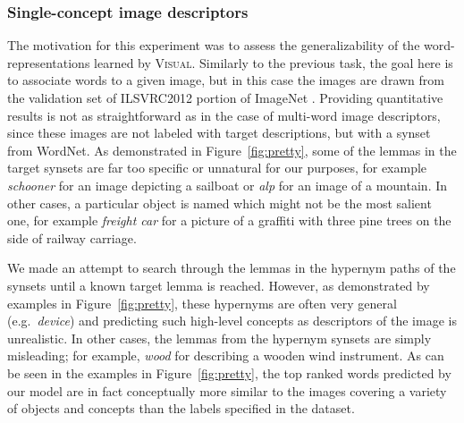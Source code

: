 \subsubsection{Single-concept image descriptors}
The motivation for this experiment was to assess
the generalizability of the word-representations learned by \textsc{Visual}.
Similarly to the previous task, the goal here is to associate words to a
given image, but in this case the images are drawn from the
validation set of ILSVRC2012 portion of ImageNet
\citep{russakovsky2015imagenet}. Providing quantitative results is not as
straightforward as in the case of multi-word image descriptors, since
these images are not labeled with target descriptions, but with a
synset from WordNet. As demonstrated in Figure~\ref{fig:pretty}, some of
the lemmas in the target synsets are far too specific or unnatural for our
purposes, for example {\it schooner} for an image
depicting a sailboat or {\it alp} for an image of a mountain.
In other cases, a particular object is named which
might not be the most salient one, for example {\it freight car} for a
picture of a graffiti with three pine trees on the side of railway carriage.

We made an attempt to search through the lemmas in the hypernym paths
of the synsets until a known target lemma is reached. However, as
demonstrated by examples in Figure~\ref{fig:pretty}, these hypernyms are
often very general (e.g.\ {\it device}) and predicting such high-level
concepts as descriptors of the image is unrealistic. In other cases,
the lemmas from the hypernym synsets are simply misleading; for
example, {\it wood} for describing a wooden wind instrument. As can be
seen in the examples in Figure~\ref{fig:pretty}, the top ranked words
predicted by our model are in fact conceptually more similar to the
images covering a variety of objects and concepts than the labels
specified in the dataset.



